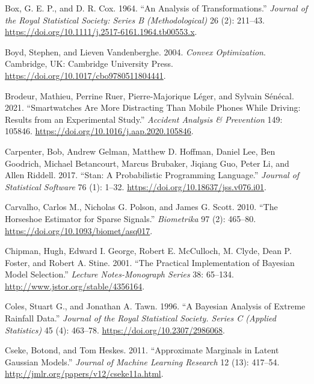 \documentclass[
  11pt,
  letterpaper,
]{scrbook}
\newlength{\cslhangindent}
\newenvironment{CSLReferences}[2] %
 {\begin{list}{}{%
  \setlength{\itemindent}{0pt}
  \setlength{\leftmargin}{0pt}
  \setlength{\parsep}{0pt}
  \ifodd #1
   \setlength{\leftmargin}{\cslhangindent}
   \setlength{\itemindent}{-1\cslhangindent}
  \fi
  \setlength{\itemsep}{#2\baselineskip}}}
 {\end{list}}
\theoremstyle{definition}
\theoremstyle{plain}
\theoremstyle{plain}
\theoremstyle{plain}
\theoremstyle{definition}
\theoremstyle{definition}
\theoremstyle{remark}
\begin{document}
\begin{CSLReferences}{1}{0}
Box, G. E. P., and D. R. Cox. 1964. {``An Analysis of
Transformations.''} \emph{Journal of the Royal Statistical Society:
Series B (Methodological)} 26 (2): 211--43.
\url{https://doi.org/10.1111/j.2517-6161.1964.tb00553.x}.

Boyd, Stephen, and Lieven Vandenberghe. 2004. \emph{Convex
Optimization}. Cambridge, UK: Cambridge University Press.
\url{https://doi.org/10.1017/cbo9780511804441}.

Brodeur, Mathieu, Perrine Ruer, Pierre-Majorique Léger, and Sylvain
Sénécal. 2021. {``Smartwatches Are More Distracting Than Mobile Phones
While Driving: Results from an Experimental Study.''} \emph{Accident
Analysis \& Prevention} 149: 105846.
\url{https://doi.org/10.1016/j.aap.2020.105846}.

Carpenter, Bob, Andrew Gelman, Matthew D. Hoffman, Daniel Lee, Ben
Goodrich, Michael Betancourt, Marcus Brubaker, Jiqiang Guo, Peter Li,
and Allen Riddell. 2017. {``{Stan}: A Probabilistic Programming
Language.''} \emph{Journal of Statistical Software} 76 (1): 1--32.
\url{https://doi.org/10.18637/jss.v076.i01}.

Carvalho, Carlos M., Nicholas G. Polson, and James G. Scott. 2010.
{``The Horseshoe Estimator for Sparse Signals.''} \emph{Biometrika} 97
(2): 465--80. \url{https://doi.org/10.1093/biomet/asq017}.

Chipman, Hugh, Edward I. George, Robert E. McCulloch, M. Clyde, Dean P.
Foster, and Robert A. Stine. 2001. {``The Practical Implementation of
{B}ayesian Model Selection.''} \emph{Lecture Notes-Monograph Series} 38:
65--134. \url{http://www.jstor.org/stable/4356164}.

Coles, Stuart G., and Jonathan A. Tawn. 1996. {``A {B}ayesian Analysis
of Extreme Rainfall Data.''} \emph{Journal of the Royal Statistical
Society. Series C (Applied Statistics)} 45 (4): 463--78.
\url{https://doi.org/10.2307/2986068}.

Cseke, Botond, and Tom Heskes. 2011. {``Approximate Marginals in Latent
{G}aussian Models.''} \emph{Journal of Machine Learning Research} 12
(13): 417--54. \url{http://jmlr.org/papers/v12/cseke11a.html}.


\end{CSLReferences}
\end{document}
